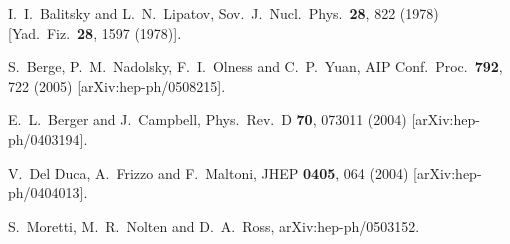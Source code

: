 \documentclass[12pt]{iopart}
\begin{document}
\begin{thebibliography}{99}
  I.~I.~Balitsky and L.~N.~Lipatov,
  Sov.\ J.\ Nucl.\ Phys.\  {\bf 28}, 822 (1978)
  [Yad.\ Fiz.\  {\bf 28}, 1597 (1978)].


  S.~Berge, P.~M.~Nadolsky, F.~I.~Olness and C.~P.~Yuan,
  AIP Conf.\ Proc.\  {\bf 792}, 722 (2005)
  [arXiv:hep-ph/0508215].


  E.~L.~Berger and J.~Campbell,
  Phys.\ Rev.\ D {\bf 70}, 073011 (2004)
  [arXiv:hep-ph/0403194].

\cite{DelDuca:2004wt}
  V.~Del Duca, A.~Frizzo and F.~Maltoni,
  JHEP {\bf 0405}, 064 (2004)
  [arXiv:hep-ph/0404013].

  S.~Moretti, M.~R.~Nolten and D.~A.~Ross,
  arXiv:hep-ph/0503152.


\end{thebibliography}
\end{document}
